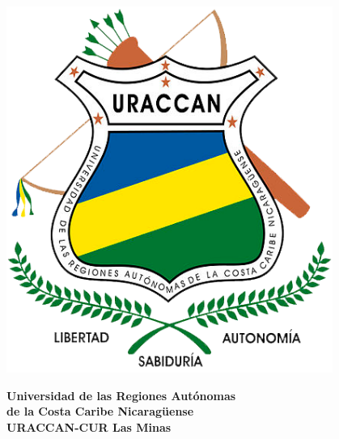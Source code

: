 \begin{titlepage}
    \noindent
    \begin{minipage}{0.2\textwidth}
        \begin{center}
            \includegraphics[width=0.8\textwidth]{images/uraccan_logo.png}
        \end{center}
    \end{minipage}%
    \begin{minipage}{0.8\textwidth}
        \begin{center}
            \Large{\textbf{Universidad de las Regiones Autónomas\\de la Costa Caribe Nicaragüense}}\\
            \vspace{0.2cm}
            \Large{\textbf{URACCAN-CUR Las Minas}}\\
        \end{center}
    \end{minipage}
\end{titlepage}
